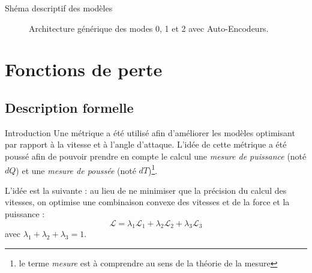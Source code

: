 \documentclass[
11pt,notheorems,hyperref={pdfauthor=whatever}
]{beamer}
\begin{document}
\begin{frame} {Shéma descriptif des modèles}
\begin{figure}
{}
        \caption{Architecture générique des modes 0, 1 et 2 avec Auto-Encodeurs.}
        \label{fig:strategies_overview_final}
\end{figure}
\end{frame}


\section{Fonctions de perte}

\subsection{Description formelle}

\begin{frame}{Introduction}
    Une métrique a été utilisé afin d'améliorer les modèles optimisant
    par rapport à la vitesse et à l'angle d'attaque. L'idée de cette métrique a été poussé 
    afin de pouvoir prendre en compte le calcul une \textit{mesure de puissance} (noté $dQ$) et une \textit{mesure de poussée} (noté $dT$)\footnote{le terme \textit{mesure} est à comprendre au sens de la théorie de la mesure}.
    
    \vspace{0.2cm}

    L'idée est la suivante : au lieu de ne minimiser que la précision du calcul des vitesses, on optimise une combinaison convexe
    des vitesses et de la force et la puissance :
    \[
        \mathcal{L} = \lambda_1\mathcal{L}_1 + \lambda_2\mathcal{L}_2 + \lambda_3\mathcal{L}_3
    \]
    avec $\lambda_1 + \lambda_2 + \lambda_3 = 1$.
\end{frame}
\end{document}

